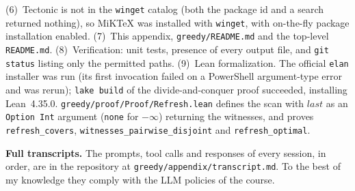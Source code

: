 (6)~Tectonic is not in the \texttt{winget} catalog (both the package id and
a search returned nothing), so MiKTeX was installed with \texttt{winget},
with on-the-fly package installation enabled.
(7)~This appendix, \texttt{greedy/README.md} and the top-level
\texttt{README.md}.
(8)~Verification: unit tests, presence of every output file, and
\texttt{git status} listing only the permitted paths.
(9)~Lean formalization. The official \texttt{elan} installer was run (its
first invocation failed on a PowerShell argument-type error and was rerun);
\texttt{lake build} of the divide-and-conquer proof succeeded, installing
Lean~4.35.0. \texttt{greedy/proof/Proof/Refresh.lean} defines the scan with
$\mathit{last}$ as an \texttt{Option Int} argument (\texttt{none} for
$-\infty$) returning the witnesses, and proves \texttt{refresh\_covers},
\texttt{witnesses\_pairwise\_disjoint} and \texttt{refresh\_optimal}.

\textbf{Full transcripts.} The prompts, tool calls and responses of every
session, in order, are in the repository at
\texttt{greedy/appendix/transcript.md}. To the best of my knowledge they
comply with the LLM policies of the course.
